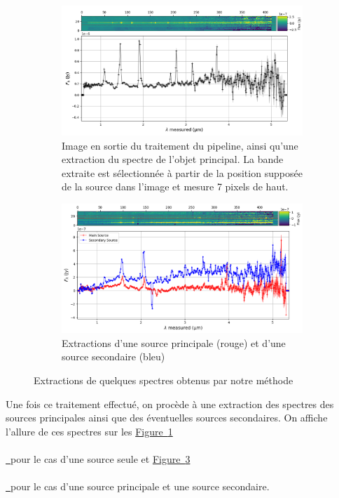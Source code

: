 \documentclass[12pt, a4paper]{article}
\newcommand*{\figref}[2][]{%
  \hyperref[{#2}]{%
    Figure~\ref*{#2}%
    \ifx\\#1\\%
    \else
      \,#1%
    \fi
  }%
}
\begin{document}
\begin{figure}[!h]
  \begin{subfigure}[t]{0.48\textwidth}
      \centering
      \includegraphics[width=1\textwidth]{assets/jw01345-o063_s32304_nirspec_clear-prism_extracted.png}
      \caption{Image en sortie du traitement du pipeline, ainsi qu'une extraction du spectre de l'objet principal. La bande extraite est sélectionnée à partir de la position supposée de la source dans l'image et mesure 7 pixels de haut.}
      \label{fig:extraction_32304}
  \end{subfigure}
  \hfill
  \begin{subfigure}[t]{0.48\textwidth}
      \centering
      \includegraphics[width=1\textwidth]{assets/extraction_2_sources_P7-23642.png}
      \caption{Extractions d'une source principale (rouge) et d'une source secondaire (bleu)}
      \label{fig:extraction_2_sources}
  \end{subfigure}
  \caption{Extractions de quelques spectres obtenus par notre méthode}
\end{figure}

Une fois ce traitement effectué, on procède à une extraction des spectres des sources principales ainsi que des éventuelles sources secondaires. On affiche l'allure de ces spectres sur les \figref{fig:extraction_32304} pour le cas d'une source seule et \figref{fig:extraction_2_sources} pour le cas d'une source principale et une source secondaire.\\
\end{document}
